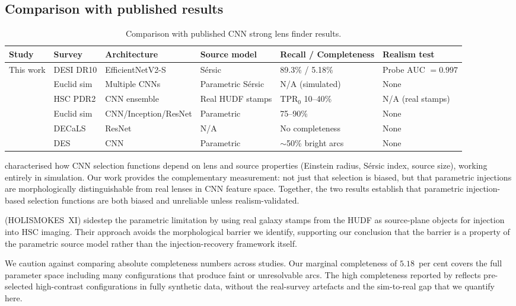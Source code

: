 \documentclass[fleqn,usenatbib]{mnras}
\begin{document}
\subsection{Comparison with published results}

\begin{table}
\caption{Comparison with published CNN strong lens finder results.}
\label{tab:published}
\centering
\begin{tabular}{llllll}
\toprule
Study & Survey & Architecture & Source model & Recall / Completeness & Realism test \\
\midrule
This work & DESI DR10 & EfficientNetV2-S & S\'{e}rsic & 89.3\% / 5.18\% & Probe AUC $= 0.997$ \\
\citet{Herle2024} & Euclid sim & Multiple CNNs & Parametric S\'{e}rsic & N/A (simulated) & None \\
\citet{Canameras2024} & HSC PDR2 & CNN ensemble & Real HUDF stamps & TPR$_0$ 10--40\% & N/A (real stamps) \\
\citet{EuclidPrepXXXIII} & Euclid sim & CNN/Inception/ResNet & Parametric & 75--90\% & None \\
\citet{Huang2020} & DECaLS & ResNet & N/A & No completeness & None \\
\citet{Jacobs2019} & DES & CNN & Parametric & $\sim$50\% bright arcs & None \\
\bottomrule
\end{tabular}
\end{table}

\citet{Herle2024} characterised how CNN selection functions depend on lens and source properties (Einstein radius, S\'{e}rsic index, source size), working entirely in simulation.  Our work provides the complementary measurement: not just that selection is biased, but that parametric injections are morphologically distinguishable from real lenses in CNN feature space.  Together, the two results establish that parametric injection-based selection functions are both biased and unreliable unless realism-validated.

\citet{Canameras2024} (HOLISMOKES~XI) sidestep the parametric limitation by using real galaxy stamps from the HUDF as source-plane objects for injection into HSC imaging.  Their approach avoids the morphological barrier we identify, supporting our conclusion that the barrier is a property of the parametric source model rather than the injection-recovery framework itself.

We caution against comparing absolute completeness numbers across studies.  Our marginal completeness of $5.18$~per cent covers the full parameter space including many configurations that produce faint or unresolvable arcs.  The high completeness reported by \citet{EuclidPrepXXXIII} reflects pre-selected high-contrast configurations in fully synthetic data, without the real-survey artefacts and the sim-to-real gap that we quantify here.
\end{document}
